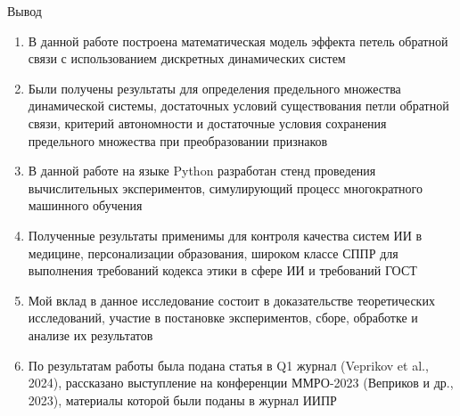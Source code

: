 \documentclass[aspectratio=169]{beamer}
\begin{document}
    \begin{frame}{Вывод}
        \begin{enumerate}
            \footnotesize
            \item В данной работе построена математическая модель эффекта петель обратной связи с использованием дискретных динамических систем

            \item Были получены результаты для определения предельного множества динамической системы, достаточных условий существования петли обратной связи, критерий автономности и достаточные условия сохранения предельного множества при преобразовании признаков

            \item В данной работе на языке Python разработан стенд проведения вычислительных экспериментов, симулирующий процесс многократного машинного обучения

            
            \item Полученные результаты применимы для контроля качества систем ИИ в медицине, персонализации образования, широком классе СППР для выполнения требований кодекса этики в сфере ИИ и требований ГОСТ

            \item Мой вклад в данное исследование состоит в доказательстве теоретических исследований, участие в постановке экспериментов, сборе, обработке и анализе их результатов

            \item По результатам работы была подана статья в Q1 журнал (Veprikov et al., 2024), рассказано выступление на конференции ММРО-2023 (Веприков и др., 2023), материалы которой были поданы в журнал ИИПР
        \end{enumerate}

    \end{frame}
\end{document}
